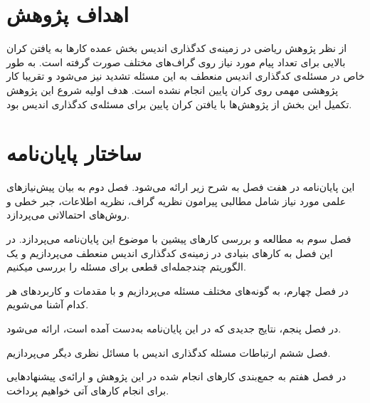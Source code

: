  

\section{اهداف پژوهش}
از نظر پژوهش ریاضی در زمینه‌ی کدگذاری اندیس بخش عمده کارها به یافتن کران بالایی برای تعداد پیام مورد نیاز روی گراف‌های مختلف صورت گرفته است. به طور خاص در مسئله‌ی کدگذاری اندیس منعطف به این مسئله تشدید نیز می‌شود و تقریبا کار پژوهشی‌ مهمی روی کران پایین انجام نشده است. هدف اولیه شروع این پژوهش تکمیل این بخش از پژوهش‌ها با یافتن کران پایین برای مسئله‌ی کدگذاری اندیس بود.

\section{ساختار پایان‌نامه}

این پایان‌نامه در هفت فصل به شرح زیر ارائه می‌شود.
فصل دوم به بیان پیش‌نیازهای علمی مورد نیاز شامل مطالبی پیرامون نظریه گراف، نظریه اطلاعات، جبر خطی و روش‌های احتمالاتی  می‌پردازد.

فصل سوم به مطالعه و بررسی کارهای پیشین با موضوع این پایان‌نامه می‌پردازد. در این فصل به کارهای بنیادی 
در زمینه‌ی کدگذاری اندیس منعطف می‌پردازیم و یک الگوریتم چندجمله‌ای قطعی برای مسئله را بررسی میکنیم.

در فصل چهارم، به گونه‌های مختلف مسئله می‌پردازیم و با مقدمات و کاربردهای هر کدام آشنا می‌شویم.

در فصل پنجم، نتایج جدیدی که در این پایان‌نامه به‌دست آمده است، ارائه می‌شود.

فصل ششم ارتباطات مسئله کدگذاری اندیس با مسائل نظری دیگر می‌پردازیم.

در فصل هفتم به جمع‌بندی کارهای انجام شده در این پژوهش و ارائه‌ی پیشنهادهایی برای انجام کارهای آتی خواهیم پرداخت.